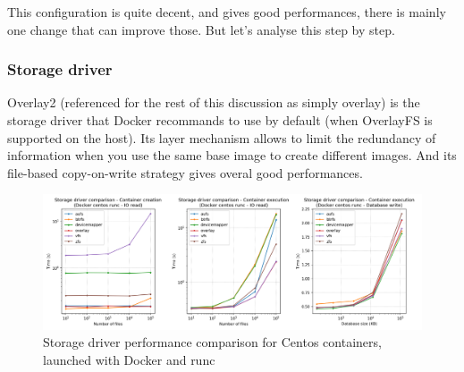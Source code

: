 This configuration is quite decent, and gives good performances, there is mainly one change that can improve those.  But let's analyse this step by step.

\subsubsection{Storage driver}
Overlay2 (referenced for the rest of this discussion as simply overlay) is the storage driver that Docker recommands to use by default (when OverlayFS is supported on the host).  Its layer mechanism allows to limit the redundancy of information when you use the same base image to create different images.  And its file-based copy-on-write strategy gives overal good performances.

\begin{figure}[h!]
  \begin{center}
    \includegraphics[width=\linewidth]{images/question-1-storage-driver.png}
    \caption{Storage driver performance comparison for Centos containers, launched with Docker and runc}
    \label{fig:q1:storage-driver}
  \end{center}
\end{figure}

